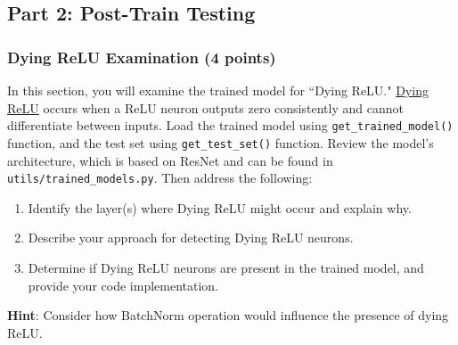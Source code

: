 \documentclass[11pt, oneside]{article}   	%
\begin{document}
\subsection*{Part 2: Post-Train Testing}

\subsubsection*{Dying ReLU Examination (4 points)}
In this section, you will examine the trained model for ``Dying ReLU." \href{https://datascience.stackexchange.com/questions/5706/what-is-the-dying-relu-problem-in-neural-networks}{Dying ReLU} occurs when a ReLU neuron outputs zero consistently and cannot differentiate between inputs. 
Load the trained model using \texttt{get\_trained\_model()} function, and the test set using \texttt{get\_test\_set()} function. Review the model's architecture, which is based on ResNet and can be found in \texttt{utils/trained\_models.py}. Then address the following:

\begin{enumerate}
    \item Identify the layer(s) where Dying ReLU might occur and explain why.
    \item Describe your approach for detecting Dying ReLU neurons. 
    \item Determine if Dying ReLU neurons are present in the trained model, and provide your code implementation.
\end{enumerate}
\textbf{Hint}:
Consider how BatchNorm operation would influence the presence of dying ReLU.
\end{document}
